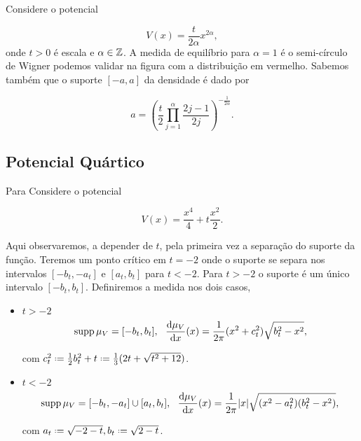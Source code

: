 Considere o potencial

\[
V(x) = \frac{t}{2\alpha} x^{2\alpha},
\]
onde $t > 0$ é escala e $\alpha \in \mathbb{Z}$. A medida de equilíbrio para $\alpha = 1$ é o semi-círculo de Wigner podemos validar na figura com a distribuição em vermelho. Sabemos também que o suporte $[-a, a]$ da densidade é dado por

\[
a = \left( \frac{t}{2} \prod_{j=1}^{\alpha} \frac{2j-1}{2j} \right)^{-\frac{1}{2\alpha}}.
\]


\subsection{Potencial Quártico}

Para Considere o potencial

\begin{equation}
	V(x) = \frac{x^4}{4} + t \frac{x^2}{2}.
	\label{Equação: Quartico}	
\end{equation}

\noindent Aqui observaremos, a depender de $t$, pela primeira vez a separação do suporte da função. Teremos um ponto crítico em $t=-2$ onde o suporte se separa nos intervalos $[-b_t, -a_t]$ e $[a_t, b_t]$ para $t < -2$. Para $t > -2$ o suporte é um único intervalo $[-b_t, b_t]$. Definiremos a medida nos dois casos,

\begin{itemize}
	\item \(t > -2\)
	\[
	\operatorname{supp} \mu_V = [-b_t, b_t], \ \ \frac{\dd \mu_V}{\dd x}(x) = \frac{1}{2\pi} (x^2 + c_t^2) \sqrt{b_t^2 - x^2},
	\]
	
	com $c_t^2 \deff\frac{1}{2} b_t^2 + t \deff \frac{1}{3} (2t + \sqrt{t^2 + 12})$.
	
	\item \(t < -2\)
	\[
	\operatorname{supp} \mu_V = [-b_t, -a_t] \cup [a_t, b_t], \ \ \frac{\dd \mu_V}{\dd x}(x) = \frac{1}{2\pi} |x| \sqrt{(x^2 - a_t^2)(b_t^2 - x^2)},
	\]
	
	com $ a_t \deff \sqrt{-2-t}, b_t \deff \sqrt{2-t}$.
\end{itemize}
